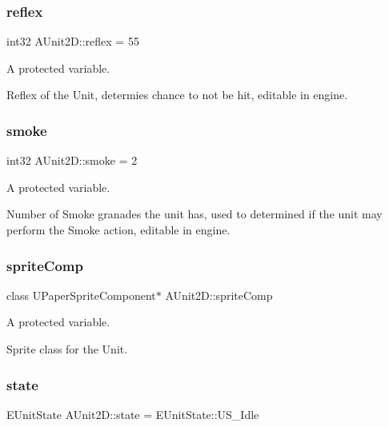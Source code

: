 \subsubsection{\texorpdfstring{reflex}{reflex}}
{\footnotesize\ttfamily int32 A\+Unit2\+D\+::reflex = 55\hspace{0.3cm}{\ttfamily [protected]}}



A protected variable. 

Reflex of the Unit, determies chance to not be hit, editable in engine. \hypertarget{class_a_unit2_d_a6cfd32ab7bfaa5dbc64defd1f74bf459}{}\label{class_a_unit2_d_a6cfd32ab7bfaa5dbc64defd1f74bf459} 
\subsubsection{\texorpdfstring{smoke}{smoke}}
{\footnotesize\ttfamily int32 A\+Unit2\+D\+::smoke = 2\hspace{0.3cm}{\ttfamily [protected]}}



A protected variable. 

Number of Smoke granades the unit has, used to determined if the unit may perform the Smoke action, editable in engine. \hypertarget{class_a_unit2_d_a03b2c6b3e63c261e81b5a193ed0d4acd}{}\label{class_a_unit2_d_a03b2c6b3e63c261e81b5a193ed0d4acd} 
\subsubsection{\texorpdfstring{sprite\+Comp}{spriteComp}}
{\footnotesize\ttfamily class U\+Paper\+Sprite\+Component$\ast$ A\+Unit2\+D\+::sprite\+Comp\hspace{0.3cm}{\ttfamily [protected]}}



A protected variable. 

Sprite class for the Unit. \hypertarget{class_a_unit2_d_a33b3a09dc710021ce343630e828ebb1b}{}\label{class_a_unit2_d_a33b3a09dc710021ce343630e828ebb1b} 
\subsubsection{\texorpdfstring{state}{state}}
{\footnotesize\ttfamily E\+Unit\+State A\+Unit2\+D\+::state = E\+Unit\+State\+::\+U\+S\+\_\+\+Idle}




